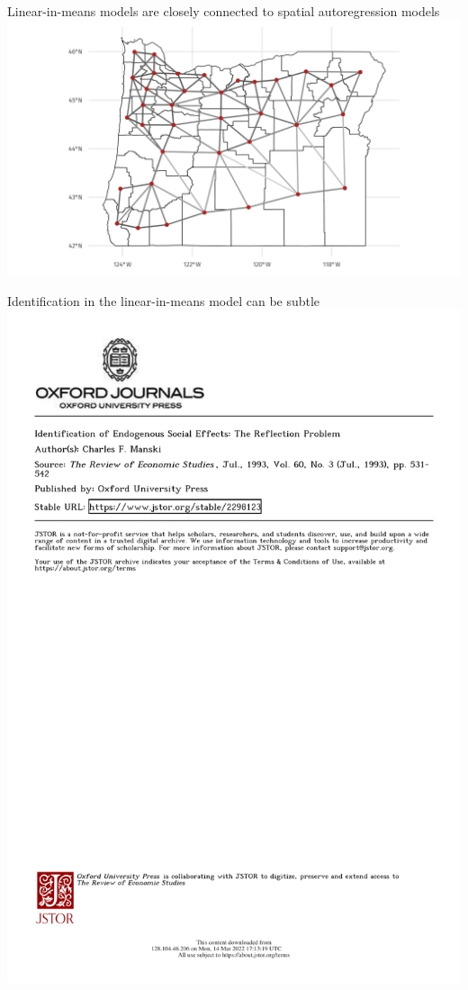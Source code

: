 \documentclass[aspectratio=169]{beamer}
\theoremstyle{remark}
\begin{document}
\begin{frame}{Linear-in-means models are closely connected to spatial autoregression models}
    \centering
    \includegraphics[height=0.95\textheight]{./figures/oregon_map.png}
\end{frame}

\begin{frame}{Identification in the linear-in-means model can be subtle}
    \centering
    \includegraphics[height=0.95\textheight, page=2, trim={0 14cm 0 0}, clip]{./papers/manski.pdf}
\end{frame}
\end{document}
